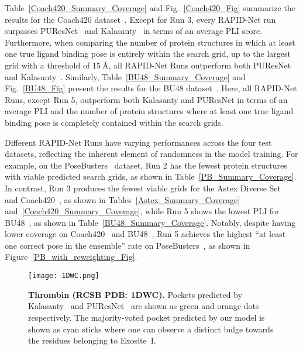 \documentclass[10pt,conference]{IEEEtran}
\begin{document}
Table~\ref{Coach420_Summary_Coverage} and Fig.~\ref{Coach420_Fig} summarize the results for the Coach420 dataset~\cite{Roy2012}. Except for Run 3, every RAPID-Net run surpasses PUResNet~\cite{kandel2021puresnet} and Kalasanty~\cite{stepniewska2020improving} in terms of an average PLI score. Furthermore, when comparing the number of protein structures in which at least one true ligand binding pose is entirely within the search grid, up to the largest grid with a threshold of $15\ \text{\AA}$, all RAPID-Net Runs outperform both PUResNet~\cite{kandel2021puresnet} and Kalasanty~\cite{stepniewska2020improving}. Similarly, Table~\ref{BU48_Summary_Coverage} and Fig.~\ref{BU48_Fig} present the results for the BU48 dataset~\cite{Huang2006}. Here, all RAPID-Net Runs, except Run 5, outperform both Kalasanty and PUResNet in terms of an average PLI and the number of protein structures where at least one true ligand binding pose is completely contained within the search grids. 


Different RAPID-Net Runs have varying performances across the four test datasets, reflecting the inherent element of randomness in the model training. For example, on the PoseBusters~\cite{Buttenschoen2024} dataset, Run 2 has the fewest protein structures with viable predicted search grids, as shown in Table~\ref{PB_Summary_Coverage}. In contrast, Run 3 produces the fewest viable grids for the Astex Diverse Set~\cite{hartshorn2007diverse} and Coach420~\cite{Roy2012}, as shown in Tables~\ref{Astex_Summary_Coverage} and~\ref{Coach420_Summary_Coverage}, while Run 5 shows the lowest PLI for BU48~\cite{Huang2006}, as shown in Table~\ref{BU48_Summary_Coverage}. Notably, despite having lower coverage on Coach420~\cite{Roy2012} and BU48~\cite{Huang2006}, Run 5 achieves the highest ``at least one correct pose in the ensemble'' rate on PoseBusters~\cite{Buttenschoen2024}, as shown in Figure~\ref{PB_with_reweighting_Fig}.

\begin{figure}[h]{}
\texttt{[image: 1DWC.png]}
  \caption{\textbf{Thrombin (RCSB PDB: 1DWC).} Pockets predicted by Kalasanty~\cite{stepniewska2020improving} and PUResNet~\cite{kandel2021puresnet} are shown as green and orange dots respectively. The majority-voted pocket predicted by our model is shown as cyan sticks where one can observe a distinct bulge towards the residues belonging to Exosite~\rm{I}.}
  \label{1DWC_Fig}
\end{figure}
\end{document}
